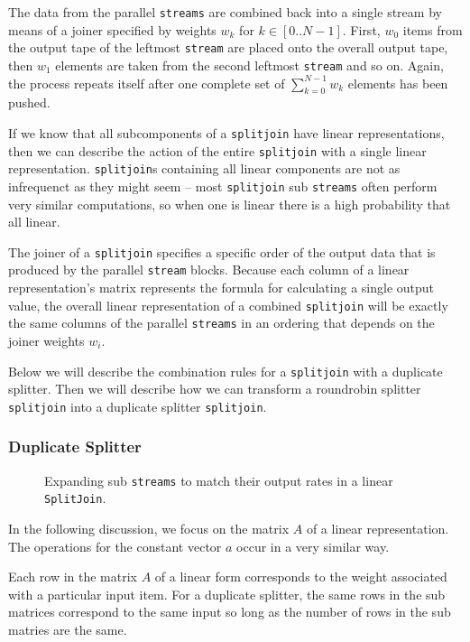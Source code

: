 The data from the parallel {\tt streams} are combined back into a single stream by means of
a joiner specified by weights $w_k$ for $k\in[0..N-1]$. First, $w_0$ items from the output tape of the 
leftmost {\tt stream} are placed onto the overall output tape, then 
$w_1$ elements are taken from the second leftmost {\tt stream} and so on. 
Again, the process repeats itself after one complete set of $\sum_{k=0}^{N-1} w_k$ 
elements has been pushed.

If we know that all subcomponents of a {\tt splitjoin} 
have linear representations, then we can describe the action of the entire {\tt splitjoin} 
with a single linear representation.
{\tt splitjoin}s containing all linear components are not as infrequenct as they might seem -- 
most {\tt splitjoin} sub {\tt streams} often perform very similar computations, so when one 
is linear there is a high probability that all linear.

The joiner of a {\tt splitjoin} specifies a specific order of the output data 
that is produced by the parallel {\tt stream} blocks. Because each column 
of a linear representation's matrix represents the formula for calculating a single output value, 
the overall linear representation of a combined {\tt splitjoin} will be exactly 
the same columns of the parallel {\tt streams} in an ordering that depends on the joiner weights $w_i$.

Below we will describe the combination rules for a {\tt splitjoin}
with a duplicate splitter. Then we will describe how we can transform 
a roundrobin splitter {\tt splitjoin} into a duplicate splitter {\tt splitjoin}. 


\subsubsection{Duplicate Splitter}

\begin{figure}
\center
\epsfxsize=3.0in
\caption{Expanding sub {\tt streams} to match their output rates in a linear {\tt SplitJoin}.}
\label{fig:splitjoin-duplicate-ratematch}
\end{figure}

In the following discussion, we focus on the matrix $A$ of a linear representation.
The operations for the constant vector $a$ occur in a very similar way.

Each row in the matrix $A$ of a linear form corresponds to the
weight associated with a particular input item. For a duplicate splitter,
the same rows in the sub matrices correspond to the same
input so long as the number of rows in the sub matries are the same.

